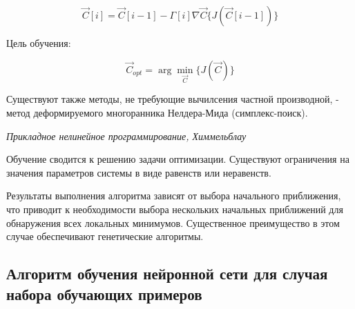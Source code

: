 \documentclass{article}
\begin{document}
\begin{equation}
    \vec{C}[i] = \vec{C}[i-1] - \Gamma[i] \nabla\vec{C} \{ J(\vec{C}[i-1]) \}
\end{equation}

Цель обучения: 

\begin{equation}
    \vec{C}_{opt} = \arg \min_{\vec{C}} \{ J(\vec{C}) \}
\end{equation}

Существуют также методы, не требующие вычилсения частной производной, - метод деформируемого многоранника Нелдера-Мида (симплекс-поиск).

\begin{myquote}
    \textit{Прикладное нелинейное программирование, Химмельблау}
\end{myquote}

Обучение сводится к решению задачи оптимизации. Существуют ограничения на значения параметров системы в виде равенств или неравенств.

Результаты выполнения алгоритма зависят от выбора начального приближения, что приводит к необходимости выбора нескольких начальных приближений для обнаружения всех локальных минимумов.
Существенное преимущество в этом случае обеспечивают генетические алгоритмы.

\subsection{Алгоритм обучения нейронной сети для случая набора обучающих примеров}
\end{document}
